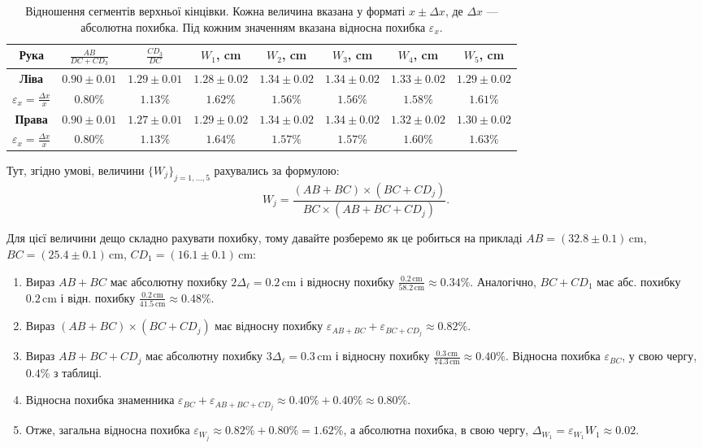 \documentclass{hw_template}
\begin{document}
\begin{table}[H]
    \centering
    \hspace*{-3em}\begin{tabular}{c:ccccccc}
        \hline
        \textbf{Рука} & $\frac{AB}{DC+CD_3}$ & $\frac{CD_3}{DC}$ & \textbf{$W_1$, cm} & \textbf{$W_2$, cm} & \textbf{$W_3$, cm} & \textbf{$W_4$, cm} & \textbf{$W_5$, cm} \\
        \hline
        \textbf{Ліва} & $0.90 \pm 0.01$ & $1.29 \pm 0.01$ & $1.28 \pm 0.02$ & $1.34 \pm 0.02$ & $1.34 \pm 0.02$ & $1.33 \pm 0.02$ & $1.29 \pm 0.02$  \\
        $\varepsilon_x = \frac{\Delta x}{x}$ & $0.80\%$ & $1.13\%$ & $1.62\%$ & $1.56\%$ & $1.56\%$ & $1.58\%$ & $1.61\%$ \\
        \hdashline
        \textbf{Права} & $0.90 \pm 0.01$ & $1.27 \pm 0.01$ & $1.29 \pm 0.02$ & $1.34 \pm 0.02$ & $1.34 \pm 0.02$ & $1.32 \pm 0.02$ & $1.30 \pm 0.02$  \\
        $\varepsilon_x = \frac{\Delta x}{x}$ & $0.80\%$ & $1.13\%$ & $1.64\%$ & $1.57\%$ & $1.57\%$ & $1.60\%$ & $1.63\%$ \\
        \hline
    \end{tabular}
    \caption{Відношення сегментів верхньої кінцівки. Кожна величина вказана у форматі $x \pm \Delta x$, де $\Delta x$ --- абсолютна похибка. Під кожним значенням вказана відносна похибка $\varepsilon_x$.}
\end{table}

Тут, згідно умові, величини $\{W_j\}_{j=1,\dots,5}$ рахувались за формулою:
\begin{equation*}
    W_j = \frac{(AB+BC) \times (BC + CD_j)}{BC \times (AB+BC+CD_j)}.
\end{equation*}

Для цієї величини дещо складно рахувати похибку, тому давайте розберемо як це робиться 
на прикладі $AB=(32.8 \pm 0.1)\,\text{cm}$, $BC=(25.4 \pm 0.1)\,\text{cm}$, $CD_1=(16.1\pm 0.1)\,\text{cm}$:
\begin{enumerate}
    \item Вираз $AB+BC$ має абсолютну похибку $2\Delta_{\ell}=0.2\,\text{cm}$ і відносну похибку $\frac{0.2\,\text{cm}}{58.2 \, \text{cm}} \approx 0.34\%$. Аналогічно, $BC+CD_1$ має абс. похибку $0.2\,\text{cm}$ і відн. похибку $\frac{0.2\,\text{cm}}{41.5\,\text{cm}} \approx 0.48\%$.
    \item Вираз $(AB+BC) \times (BC+CD_j)$ має відносну похибку $\varepsilon_{AB+BC} + \varepsilon_{BC+CD_j} \approx 0.82\%$.
    \item Вираз $AB+BC+CD_j$ має абсолютну похибку $3\Delta_{\ell} = 0.3\,\text{cm}$ і відносну похибку $\frac{0.3\,\text{cm}}{74.3\,\text{cm}} \approx 0.40\%$. Відносна похибка $\varepsilon_{BC}$, у свою чергу, $0.4\%$ з таблиці.
    \item Відносна похибка знаменника $\varepsilon_{BC} + \varepsilon_{AB+BC+CD_j} \approx 0.40\% + 0.40\% \approx 0.80\%$.
    \item Отже, загальна відносна похибка $\varepsilon_{W_j} \approx 0.82\% + 0.80\% = 1.62\%$, а абсолютна похибка, в свою чергу, $\Delta_{W_1} = \varepsilon_{W_1}W_1 \approx 0.02$.
\end{enumerate}
\end{document}
